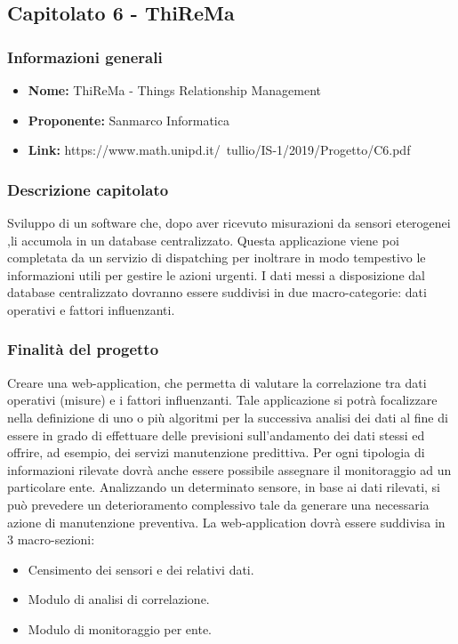 \subsection{Capitolato 6 - ThiReMa}

	\subsubsection{Informazioni generali}
		\begin{itemize}
			\item \textbf{Nome:} ThiReMa - Things Relationship Management
			\item \textbf{Proponente:} Sanmarco Informatica
			\item \textbf{Link:} https://www.math.unipd.it/~tullio/IS-1/2019/Progetto/C6.pdf
		\end{itemize}

	\subsubsection{Descrizione capitolato}
		Sviluppo di un software che,  dopo aver ricevuto misurazioni da sensori eterogenei ,li accumola in un database centralizzato. Questa applicazione viene poi completata da un servizio di dispatching per inoltrare in modo tempestivo le informazioni utili per gestire le azioni urgenti.
		I dati messi a disposizione dal database centralizzato dovranno essere suddivisi in due macro-categorie: dati operativi e fattori influenzanti.

	\subsubsection{Finalità del progetto}
		Creare una web-application, che permetta di valutare la correlazione tra dati operativi (misure) e i fattori influenzanti. Tale applicazione si potrà focalizzare nella definizione di uno o più algoritmi per la successiva analisi dei dati al fine di essere in grado di effettuare delle previsioni sull’andamento dei dati stessi ed offrire, ad esempio, dei servizi manutenzione predittiva.
		Per ogni tipologia di informazioni rilevate dovrà anche essere	possibile assegnare il monitoraggio ad un particolare ente. 
		Analizzando un determinato sensore, in base ai dati rilevati, si può prevedere un deterioramento complessivo tale da generare una necessaria azione di manutenzione preventiva.
		La web-application dovrà essere suddivisa in 3 macro-sezioni:
			\begin{itemize}
				\item Censimento dei sensori e dei relativi dati.
				\item Modulo di analisi di correlazione.
				\item Modulo di monitoraggio per ente.
			\end{itemize}
		
